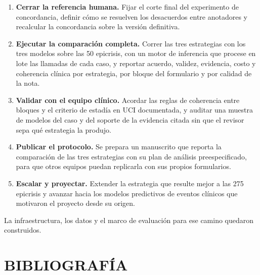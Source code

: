 \documentclass[12pt,letterpaper]{article}
\begin{document}
\begin{enumerate}
    \item \textbf{Cerrar la referencia humana.} Fijar el corte final del experimento de concordancia, definir cómo se resuelven los desacuerdos entre anotadores y recalcular la concordancia sobre la versión definitiva.
    \item \textbf{Ejecutar la comparación completa.} Correr las tres estrategias con los tres modelos sobre las 50 epicrisis, con un motor de inferencia que procese en lote las llamadas de cada caso, y reportar acuerdo, validez, evidencia, costo y coherencia clínica por estrategia, por bloque del formulario y por calidad de la nota.
    \item \textbf{Validar con el equipo clínico.} Acordar las reglas de coherencia entre bloques y el criterio de estadía en UCI documentada, y auditar una muestra de modelos del caso y del soporte de la evidencia citada sin que el revisor sepa qué estrategia la produjo.
    \item \textbf{Publicar el protocolo.} Se prepara un manuscrito que reporta la comparación de las tres estrategias con su plan de análisis preespecificado, para que otros equipos puedan replicarla con sus propios formularios.
    \item \textbf{Escalar y proyectar.} Extender la estrategia que resulte mejor a las 275 epicrisis y avanzar hacia los modelos predictivos de eventos clínicos que motivaron el proyecto desde su origen.
\end{enumerate}

La infraestructura, los datos y el marco de evaluación para ese camino quedaron construidos.

\newpage
\section*{BIBLIOGRAFÍA}
\end{document}
